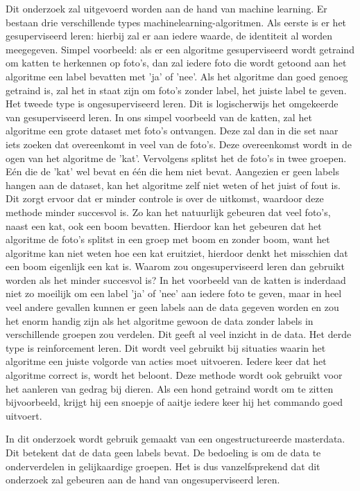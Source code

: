 Dit onderzoek zal uitgevoerd worden aan de hand van machine learning. Er bestaan drie verschillende types machinelearning-algoritmen. Als eerste is er het gesuperviseerd leren: hierbij zal er aan iedere waarde, de identiteit al worden meegegeven. Simpel voorbeeld: als er een algoritme gesuperviseerd wordt getraind  om katten te herkennen op foto's, dan zal iedere foto die wordt getoond aan het algoritme een label bevatten met 'ja' of 'nee'. Als het algoritme dan goed genoeg getraind is, zal het in staat zijn om foto's zonder label, het juiste label te geven.
Het tweede type is ongesuperviseerd leren. Dit is logischerwijs het omgekeerde van gesuperviseerd leren. In ons simpel voorbeeld van de katten, zal het algoritme een grote dataset met foto's ontvangen. Deze zal dan in die set naar iets zoeken dat overeenkomt in veel van de foto's. Deze overeenkomst wordt in de ogen van het algoritme de 'kat'. Vervolgens splitst het de foto's in twee groepen. Eén die de 'kat' wel bevat en één die hem niet bevat. Aangezien er geen labels hangen aan de dataset, kan het algoritme zelf niet weten of het juist of fout is. Dit zorgt ervoor dat er minder controle is over de uitkomst, waardoor deze methode minder succesvol is. Zo kan het natuurlijk gebeuren dat veel foto's, naast een kat, ook een boom bevatten. Hierdoor kan het gebeuren dat het algoritme de foto's splitst in een groep met boom en zonder boom, want het algoritme kan niet weten hoe een kat eruitziet, hierdoor denkt het misschien dat een boom eigenlijk een kat is. Waarom zou ongesuperviseerd leren dan gebruikt worden als het minder succesvol is? In het voorbeeld van de katten is inderdaad niet zo moeilijk om een label 'ja' of 'nee' aan iedere foto te geven, maar in heel veel andere gevallen kunnen er geen labels aan de data gegeven worden en zou het enorm handig zijn als het algoritme gewoon de data zonder labels in verschillende groepen zou verdelen. Dit geeft al veel inzicht in de data.
Het derde type is reinforcement leren. Dit wordt veel gebruikt bij situaties waarin het algoritme een juiste volgorde van acties moet uitvoeren. Iedere keer dat het algoritme correct is, wordt het beloont. Deze methode wordt ook gebruikt voor het aanleren van gedrag bij dieren. Als een hond getraind wordt om te zitten bijvoorbeeld, krijgt hij een snoepje of aaitje iedere keer hij het commando goed uitvoert.

In dit onderzoek wordt gebruik gemaakt van een ongestructureerde masterdata. Dit betekent dat de data geen labels bevat. De bedoeling is om de data te onderverdelen in gelijkaardige groepen. Het is dus vanzelfsprekend dat dit onderzoek zal gebeuren aan de hand van ongesuperviseerd leren.

